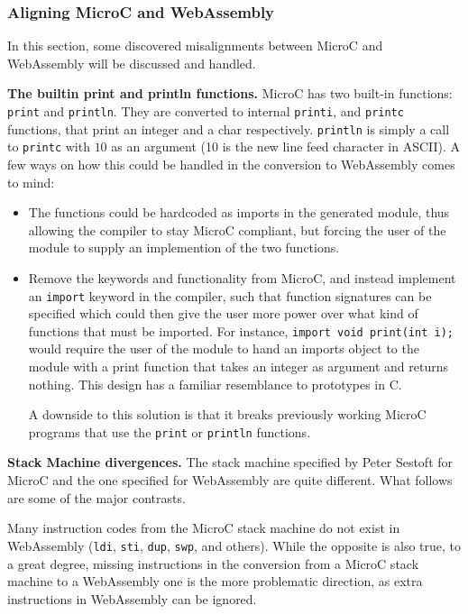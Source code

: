 \documentclass[a4paper]{article}
\begin{document}
\subsubsection{Aligning MicroC and WebAssembly}
\label{sec:problem-analysis-webassembly:aligning}
In this section, some discovered misalignments between MicroC and WebAssembly will be discussed and handled.

\noindent \textbf{The builtin print and println functions.} MicroC has two built-in functions: \texttt{print} and \texttt{println}. They are converted to internal \texttt{printi}, and \texttt{printc} functions, that print an integer and a char respectively. \texttt{println} is simply a call to \texttt{printc} with $10$ as an argument (10 is the new line feed character in ASCII). A few ways on how this could be handled in the conversion to WebAssembly comes to mind:
\begin{itemize}
	\item The functions could be hardcoded as imports in the generated module, thus allowing the compiler to stay MicroC compliant, but forcing the user of the module to supply an implemention of the two functions.
	\item Remove the keywords and functionality from MicroC, and instead implement an \texttt{import} keyword in the compiler, such that function signatures can be specified which could then give the user more power over what kind of functions that must be imported. For instance, \texttt{import void print(int i);} would require the user of the module to hand an imports object to the module with a print function that takes an integer as argument and returns nothing. This design has a familiar resemblance to prototypes in C.

	A downside to this solution is that it breaks previously working MicroC programs that use the \texttt{print} or \texttt{println} functions.
\end{itemize}

\noindent \textbf{Stack Machine divergences.} The stack machine specified by Peter Sestoft for MicroC and the one specified for WebAssembly are quite different. What follows are some of the major contrasts.

Many instruction codes from the MicroC stack machine do not exist in WebAssembly (\texttt{ldi}, \texttt{sti}, \texttt{dup}, \texttt{swp}, and others). While the opposite is also true, to a great degree, missing instructions in the conversion from a MicroC stack machine to a WebAssembly one is the more problematic direction, as extra instructions in WebAssembly can be ignored.
\end{document}
